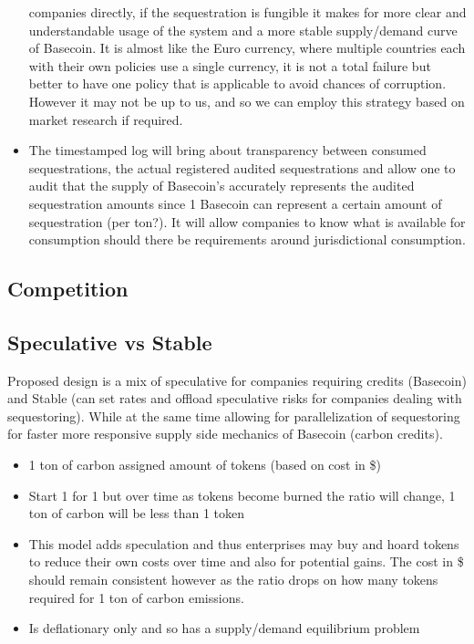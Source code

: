 \documentclass{article}
\begin{document}
\begin{itemize}
companies directly, if the sequestration is fungible it makes for more clear and
understandable usage of the system and a more stable supply/demand curve of Basecoin. It
is almost like the Euro currency, where multiple countries each with their own policies use a
single currency, it is not a total failure but better to have one policy that is applicable to avoid
chances of corruption. However it may not be up to us, and so we can employ this strategy
based on market research if required.
\item The timestamped log will bring about transparency between consumed sequestrations, the
actual registered audited sequestrations and allow one to audit that the supply of Basecoin’s
accurately represents the audited sequestration amounts since 1 Basecoin can represent a
certain amount of sequestration (per ton?). It will allow companies to know what is available
for consumption should there be requirements around jurisdictional consumption.
\end{itemize}

\subsection{Competition}

\subsection{Speculative vs Stable}

Proposed design is a mix of speculative for companies requiring credits (Basecoin) and Stable
(can set rates and offload speculative risks for companies dealing with sequestoring). While at
the same time allowing for parallelization of sequestoring for faster more responsive supply side
mechanics of Basecoin (carbon credits).

\begin{itemize}
\item 1 ton of carbon assigned amount of tokens (based on cost in \$)
\item Start 1 for 1 but over time as tokens become burned the ratio will change, 1 ton of
carbon will be less than 1 token
\item This model adds speculation and thus enterprises may buy and hoard tokens to reduce
their own costs over time and also for potential gains. The cost in \$ should remain
consistent however as the ratio drops on how many tokens required for 1 ton of carbon
emissions.
\item Is deflationary only and so has a supply/demand equilibrium problem
\end{itemize}
\end{document}

